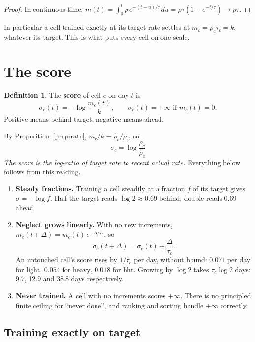 \documentclass[11pt]{article}
\theoremstyle{plain}
\theoremstyle{definition}
\newtheorem{definition}{Definition}
\newcommand{\light}{\mathrm{light}}
\newcommand{\heavy}{\mathrm{heavy}}
\newcommand{\hhr}{\mathrm{hhr}}
\begin{document}
\begin{proof}
In continuous time,
$m(t) = \int_0^t \rho\, e^{-(t-u)/\tau}\, du = \rho\tau(1 - e^{-t/\tau})
\to \rho\tau$.
\end{proof}

In particular a cell trained exactly at its target rate settles at
$m_c = \rho_c \tau_c = k$, whatever its target. This is what puts every
cell on one scale.

\section{The score}\label{sec:score}

\begin{definition}
The \textbf{score} of cell $c$ on day $t$ is
\[
\sigma_c(t) = -\log \frac{m_c(t)}{k}, \qquad \sigma_c(t) = +\infty
\text{ if } m_c(t) = 0.
\]
Positive means behind target, negative means ahead.
\end{definition}

By Proposition~\ref{prop:rate}, $m_c/k = \hat\rho_c/\rho_c$, so
\[
\boxed{\;\sigma_c = \log \frac{\rho_c}{\hat\rho_c}\;}
\]
\emph{The score is the log-ratio of target rate to recent actual rate.}
Everything below follows from this reading.

\begin{enumerate}[label=(\roman*)]
\item \textbf{Steady fractions.} Training a cell steadily at a fraction
  $f$ of its target gives $\sigma = -\log f$. Half the target reads
  $\log 2 \approx 0.69$ behind; double reads $0.69$ ahead.

\item \textbf{Neglect grows linearly.} With no new increments,
  $m_c(t + \Delta) = m_c(t)\, e^{-\Delta/\tau_c}$, so
  \[
  \sigma_c(t + \Delta) = \sigma_c(t) + \frac{\Delta}{\tau_c}.
  \]
  An untouched cell's score rises by $1/\tau_c$ per day, without bound:
  $0.071$ per day for $\light$, $0.054$ for $\heavy$, $0.018$ for
  $\hhr$. Growing by $\log 2$ takes $\tau_c \log 2$ days: 9.7, 12.9 and
  38.8 days respectively.

\item \textbf{Never trained.} A cell with no increments scores
  $+\infty$. There is no principled finite ceiling for ``never done'', and
  ranking and sorting handle $+\infty$ correctly.
\end{enumerate}

\subsection{Training exactly on target}
\end{document}
